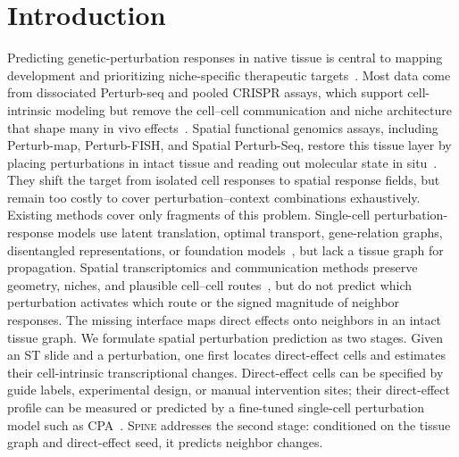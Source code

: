 \documentclass[sigconf,review,balance=false]{acmart}
\newcommand{\methodname}{\textsc{Spine}\xspace}
\begin{document}
\section{Introduction}
Predicting genetic-perturbation responses in native tissue is central to mapping development and prioritizing niche-specific therapeutic targets~\citep{dixit2016perturbseq,norman2019combinatorial,zheng2024invivo,finan2017druggable,king2019genetic}. Most data come from dissociated Perturb-seq and pooled CRISPR assays, which support cell-intrinsic modeling but remove the cell--cell communication and niche architecture that shape many in vivo effects~\citep{adamson2016crispr,datlinger2017cropsseq,replogle2022mapping,frangieh2021multimodal}. Spatial functional genomics assays, including Perturb-map, Perturb-FISH, and Spatial Perturb-Seq, restore this tissue layer by placing perturbations in intact tissue and reading out molecular state in situ~\citep{dhainaut2022spatialcrispr,binan2025perturbfish,shen2026spatialperturbseq}. They shift the target from isolated cell responses to spatial response fields, but remain too costly to cover perturbation--context combinations exhaustively.
Existing methods cover only fragments of this problem. Single-cell perturbation-response models use latent translation, optimal transport, gene-relation graphs, disentangled representations, or foundation models~\citep{lotfollahi2019scgen,bunne2023cellot,roohani2023gears,piran2024biolord,theodoris2023geneformer,cui2024scgpt,hao2024scfoundation}, but lack a tissue graph for propagation. Spatial transcriptomics and communication methods preserve geometry, niches, and plausible cell--cell routes~\citep{stahl2016spatial,vickovic2019hdst,rodriques2019slideseq,stickels2021slideseqv2,cang2023commot,dries2021giotto,phan2023stlearn,tiling2024nicheformer}, but do not predict which perturbation activates which route or the signed magnitude of neighbor responses. The missing interface maps direct effects onto neighbors in an intact tissue graph.
We formulate spatial perturbation prediction as two stages. Given an ST slide and a perturbation, one first locates direct-effect cells and estimates their cell-intrinsic transcriptional changes. Direct-effect cells can be specified by guide labels, experimental design, or manual intervention sites; their direct-effect profile can be measured or predicted by a fine-tuned single-cell perturbation model such as CPA~\citep{Lotfollahi2023}. \methodname{} addresses the second stage: conditioned on the tissue graph and direct-effect seed, it predicts neighbor changes.
\end{document}
